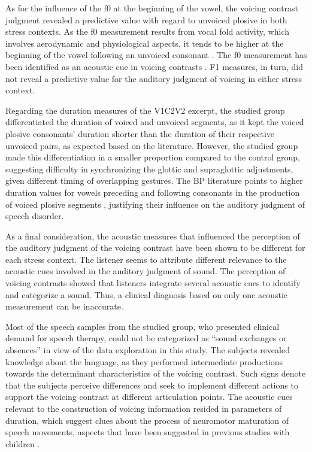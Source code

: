 As for the influence of the f0 at the beginning of the vowel, the voicing
contrast judgment revealed a predictive value with regard to unvoiced plosive
in both stress contexts. As the f0 measurement results from vocal fold
activity, which involves aerodynamic and physiological aspects, it tends to be
higher at the beginning of the vowel following an unvoiced consonant \citep{shimizu1996}.
The f0 measurement has been identified as an acoustic cue in voicing
contrasts \citep{whalen1993,hanson2009,gregio2011}. F1
measures, in turn, did not reveal a predictive value for the auditory judgment
of voicing in either stress context.

Regarding the duration measures of the V1C2V2 excerpt, the studied group
differentiated the duration of voiced and unvoiced segments, as it kept the
voiced plosive consonants’ duration shorter than the duration of their
respective unvoiced pairs, as expected based on the literature. However, the
studied group made this differentiation in a smaller proportion compared to the
control group, suggesting  difficulty in synchronizing the glottic and
supraglottic adjustments, given different timing of overlapping gestures. The
BP literature points to higher duration values for vowels preceding and
following consonants in the production of voiced plosive segments \citep{barbosa1996,gurgueira2006,britto2010},
justifying their influence on the auditory judgment of speech disorder.

As a final consideration, the acoustic measures that influenced the perception
of the auditory judgment of the voicing contrast have been shown to be
different for each stress context. The listener seems to attribute different
relevance to the acoustic cues involved in the auditory judgment of sound. The
perception of voicing contrasts showed that listeners integrate several
acoustic cues to identify and categorize a sound. Thus, a clinical diagnosis
based on only one acoustic measurement can be inaccurate.

Most of the speech samples from the studied group, who presented clinical
demand for speech therapy, could not be categorized as “sound exchanges or
absences” in view of the data exploration in this study. The subjects revealed
knowledge about the language, as they performed intermediate productions
towards the determinant characteristics of the voicing contrast. Such signs
denote that the subjects perceive differences and seek to implement different
actions to support the voicing contrast at different articulation points. The
acoustic cues relevant to the construction of voicing information resided in
parameters of duration, which suggest clues about the process of neuromotor
maturation of speech movements, aspects that have been suggested in previous
studies with children \citep{levy1993,rossi1999,albano2007}.

